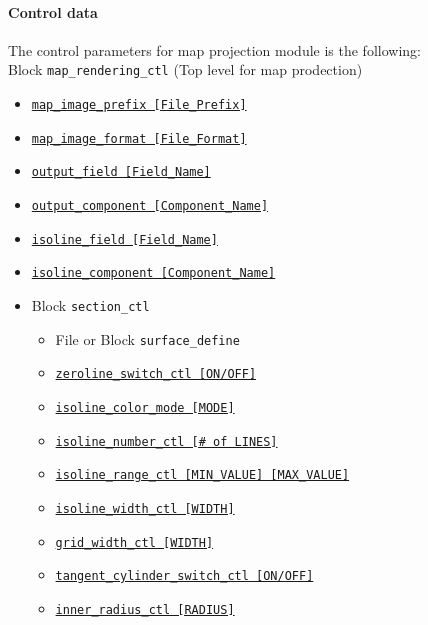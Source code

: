 \paragraph{Control data}
The control parameters for map projection module is the following:
\\
%
Block \verb|map_rendering_ctl| (Top level for map prodection)
\\
\label{href_i:map_rendering_ctl}
\begin{itemize}
	\item \hyperref[href_t:map_image_prefix]
			{\tt map\_image\_prefix    [File\_Prefix]}
	\item \hyperref[href_t:map_image_format]
			{\tt map\_image\_format    [File\_Format]}
%
	\item \hyperref[href_t:output_field]
			{\tt output\_field            [Field\_Name]}
	\item \hyperref[href_t:output_component]
			{\tt output\_component       [Component\_Name]}
	\item \hyperref[href_t:isoline_field]
			{\tt isoline\_field                [Field\_Name]}
	\item \hyperref[href_t:isoline_component]
			{\tt isoline\_component     [Component\_Name]}
%
	\item Block \verb|section_ctl|
			\label{href_i:map_section_ctl}
		\begin{itemize}
    			\item File or Block \verb|surface_define|
						\label{href_i:map_surface_define}
%
			\item \hyperref[href_t:zeroline_switch_ctl]
					{\tt zeroline\_switch\_ctl     [ON/OFF]}
			\item \hyperref[href_t:isoline_color_mode]
					{\tt isoline\_color\_mode     [MODE]}
			\item \hyperref[href_t:isoline_number_ctl]
					{\tt isoline\_number\_ctl     [\# of LINES]}
			\item \hyperref[href_t:isoline_range_ctl]
					{\tt isoline\_range\_ctl     [MIN\_VALUE]  [MAX\_VALUE]}
			\item \hyperref[href_t:isoline_width_ctl]
					{\tt isoline\_width\_ctl     [WIDTH]}
			\item \hyperref[href_t:grid_width_ctl]
					{\tt grid\_width\_ctl     [WIDTH]}
			\item \hyperref[href_t:tangent_cylinder_switch_ctl]
					{\tt tangent\_cylinder\_switch\_ctl     [ON/OFF]}
			\item \hyperref[href_t:inner_radius_ctl]
					{\tt inner\_radius\_ctl     [RADIUS]}

\end{itemize}
\end{itemize}
